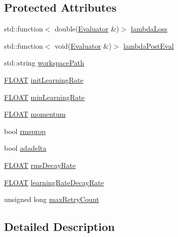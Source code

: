 \subsection*{Protected Attributes}
\begin{DoxyCompactItemize}
\item 
std\+::function$<$ double(\hyperlink{classfractal_1_1Evaluator}{Evaluator} \&)$>$ \hyperlink{classfractal_1_1AutoOptimizer_a6e9db9d03a39a7f9c3754562d54c8e6b}{lambda\+Loss}
\item 
std\+::function$<$ void(\hyperlink{classfractal_1_1Evaluator}{Evaluator} \&)$>$ \hyperlink{classfractal_1_1AutoOptimizer_a0b32551c87870d815b3333315fc72a31}{lambda\+Post\+Eval}
\item 
std\+::string \hyperlink{classfractal_1_1AutoOptimizer_a2395471e6bc9585b3a42295a030a6f80}{workspace\+Path}
\item 
\hyperlink{namespacefractal_a1c2d2530689575d5ccb56bae52af70d3}{F\+L\+O\+A\+T} \hyperlink{classfractal_1_1AutoOptimizer_a45091ce24c1eff24e60644d2d5eddb0a}{init\+Learning\+Rate}
\item 
\hyperlink{namespacefractal_a1c2d2530689575d5ccb56bae52af70d3}{F\+L\+O\+A\+T} \hyperlink{classfractal_1_1AutoOptimizer_aefc6501717ce6fc3ad1ea83ee8743c01}{min\+Learning\+Rate}
\item 
\hyperlink{namespacefractal_a1c2d2530689575d5ccb56bae52af70d3}{F\+L\+O\+A\+T} \hyperlink{classfractal_1_1AutoOptimizer_a06a388ab208b871f47edd111aad33f78}{momentum}
\item 
bool \hyperlink{classfractal_1_1AutoOptimizer_a358367f581267c957fc7fe705b19ece2}{rmsprop}
\item 
bool \hyperlink{classfractal_1_1AutoOptimizer_a7b41188a4a23629e69144073493d317f}{adadelta}
\item 
\hyperlink{namespacefractal_a1c2d2530689575d5ccb56bae52af70d3}{F\+L\+O\+A\+T} \hyperlink{classfractal_1_1AutoOptimizer_a83f0519b89b1a33810fec7503a35f732}{rms\+Decay\+Rate}
\item 
\hyperlink{namespacefractal_a1c2d2530689575d5ccb56bae52af70d3}{F\+L\+O\+A\+T} \hyperlink{classfractal_1_1AutoOptimizer_a063181ceec0a4c7f4e98ba15b74ae6a8}{learning\+Rate\+Decay\+Rate}
\item 
unsigned long \hyperlink{classfractal_1_1AutoOptimizer_a2cf0c04067aba8fd08551d9a973d3de3}{max\+Retry\+Count}
\end{DoxyCompactItemize}


\subsection{Detailed Description}


